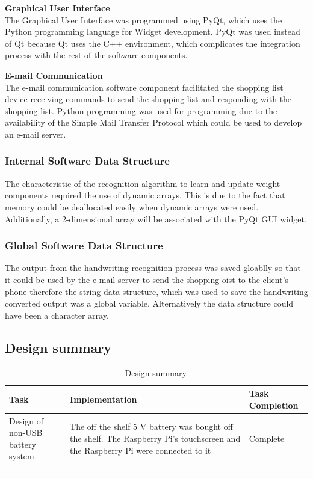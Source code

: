 \textbf{Graphical User Interface}\\
The Graphical User Interface was programmed using PyQt, which uses the Python programming language for Widget development. PyQt was used instead of Qt because Qt uses the C++ environment, which complicates the integration process with the rest of the software components.

\textbf{E-mail Communication}\\
The e-mail communication software component facilitated the shopping list device receiving commands to send the shopping list and responding with the shopping list. Python programming was used for programming due to the availability of the Simple Mail Transfer Protocol which could be used to develop an e-mail server.

\subsubsection{Internal Software Data Structure}
The characteristic of the recognition algorithm to learn and update weight components required the use of  dynamic arrays. This is due to the fact that memory could be deallocated easily when dynamic arrays were used. Additionally, a 2-dimensional array will be associated with the PyQt GUI widget.

\subsubsection{Global Software Data Structure}
The output from the handwriting recognition process was saved gloablly so that it could be used by the e-mail server to send the shopping oist to the client's phone therefore the string data structure, which was used to save the handwriting converted output was a global variable. Alternatively the data structure could have been a character array.

\subsection{Design summary}
\begin{center}
	\begin{longtable}{|p{4cm}|p{7cm}|p{5cm}|}
		\hline 
		\textbf{Task} &
		\textbf{Implementation} &
		\textbf{Task Completion}
		\\
		\hline
		Design of non-USB battery system& The off the shelf 5 V battery was bought off the shelf. The Raspberry Pi's touchscreen and the Raspberry Pi were connected to it & Complete\\
		\hline
		&  &  \\
		\hline
		 &  & \\
		
		\hline
		\caption{Design summary.}
	\end{longtable}
\end{center}
\newpage



